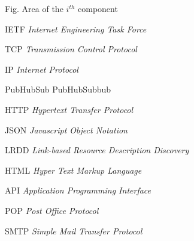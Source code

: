 \begin{siglas}
  \item[Fig.] Area of the $i^{th}$ component
  \item[IETF] \textit{Internet Engineering Task Force}
  \item[TCP] \textit{Transmission Control Protocol}
  \item[IP] \textit{Internet Protocol}
  \item[PubHubSub] PubHubSubbub
  \item[HTTP] \textit{Hypertext Transfer Protocol}
  \item[JSON] \textit{Javascript Object Notation}
  \item[LRDD] \textit{Link-based Resource Description Discovery}
  \item[HTML] \textit{Hyper Text Markup Language}
  \item[API] \textit{Application Programming Interface}
  \item[POP] \textit{Post Office Protocol}
  \item[SMTP] \textit{Simple Mail Transfer Protocol}
\end{siglas}
